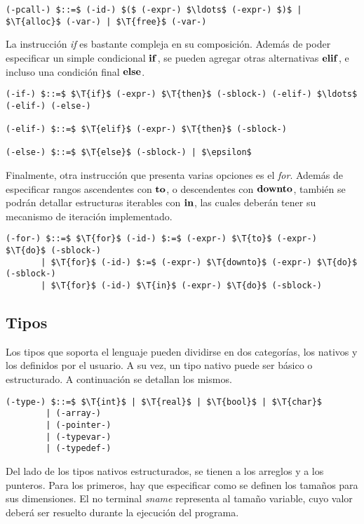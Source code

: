 \documentclass{article}
\begin{document}
\begin{lstlisting}[style = syntax]
(-pcall-) $::=$ (-id-) $($ (-expr-) $\ldots$ (-expr-) $)$ | $\T{alloc}$ (-var-) | $\T{free}$ (-var-)
\end{lstlisting}

La instrucción \textit{if} es bastante compleja en su composición.
Además de poder especificar un simple condicional $\mathbf{if}$, se pueden agregar otras alternativas $\mathbf{elif}$, e incluso una condición final $\mathbf{else}$.

\begin{lstlisting}[style = syntax]
(-if-) $::=$ $\T{if}$ (-expr-) $\T{then}$ (-sblock-) (-elif-) $\ldots$ (-elif-) (-else-)

(-elif-) $::=$ $\T{elif}$ (-expr-) $\T{then}$ (-sblock-)

(-else-) $::=$ $\T{else}$ (-sblock-) | $\epsilon$ 
\end{lstlisting}

Finalmente, otra instrucción que presenta varias opciones es el \textit{for}.
Además de especificar rangos ascendentes con $\mathbf{to}$, o descendentes con $\mathbf{downto}$, también se podrán detallar estructuras iterables con $\mathbf{in}$, las cuales deberán tener su mecanismo de iteración implementado.

\begin{lstlisting}[style = syntax]
(-for-) $::=$ $\T{for}$ (-id-) $:=$ (-expr-) $\T{to}$ (-expr-) $\T{do}$ (-sblock-)
       | $\T{for}$ (-id-) $:=$ (-expr-) $\T{downto}$ (-expr-) $\T{do}$ (-sblock-)
       | $\T{for}$ (-id-) $\T{in}$ (-expr-) $\T{do}$ (-sblock-)
\end{lstlisting}

\subsection{Tipos}

Los tipos que soporta el lenguaje pueden dividirse en dos categorías, los nativos y los definidos por el usuario.
A su vez, un tipo nativo puede ser básico o estructurado.
A continuación se detallan los mismos.

\begin{lstlisting}[style = syntax]
(-type-) $::=$ $\T{int}$ | $\T{real}$ | $\T{bool}$ | $\T{char}$
        | (-array-)
        | (-pointer-)
        | (-typevar-)
        | (-typedef-)
\end{lstlisting}

Del lado de los tipos nativos estructurados, se tienen a los arreglos y a los punteros.
Para los primeros, hay que especificar como se definen los tamaños para sus dimensiones.
El no terminal \textit{sname} representa al tamaño variable, cuyo valor deberá ser resuelto durante la ejecución del programa.
\end{document}

